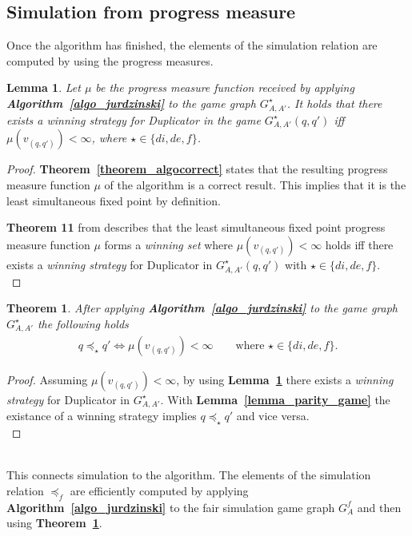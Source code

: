 \documentclass[12pt,oneside,bibliography=totoc,abstracton]{scrartcl}
\newcommand{\lemmaref}[1]{\textbf{Lemma~\ref{#1}}}
\newcommand{\theoremref}[1]{\textbf{Theorem~\ref{#1}}}
\newcommand{\algoref}[1]{\textbf{Algorithm~\ref{#1}}}
\newcommand{\libref}[1]{\textbf{\cite{#1}}}
\newtheorem{mylemma}{Lemma}
\newtheorem{mytheorem}{Theorem}
\begin{document}
\subsection{Simulation from progress measure}\label{section_compsimrelation}
Once the algorithm has finished, the elements of the simulation relation are computed
by using the progress measures.
\begin{mylemma}\label{lemma_algotostrat}
	Let $\mu$ be the progress measure function received by applying \algoref{algo_jurdzinski}
	to the game graph $G^{\star}_{A, A'}$. It holds that there exists a
	\textnormal{winning strategy} for Duplicator in the game $G^{\star}_{A, A'}(q, q')$
	iff $\mu(v_{(q, q')}) < \infty$, where $\star \in \{di, de, f\}$.
\end{mylemma}
\begin{proof}
	\theoremref{theorem_algocorrect} states that the resulting progress measure function
	$\mu$ of the algorithm is a correct result. This implies that it is the least simultaneous fixed point by definition.
	
	\textbf{Theorem 11} from \libref{jurdz_original} describes that the least simultaneous fixed point
	progress measure function $\mu$ forms a \textit{winning set} where $\mu(v_{(q, q')}) < \infty$ holds iff there
	exists a \textit{winning strategy} for Duplicator in $G^{\star}_{A, A'}(q, q')$ with $\star \in \{di, de, f\}$.\\
\end{proof}
\begin{mytheorem}\label{theorem_algotosim}
	After applying \algoref{algo_jurdzinski} to the game graph $G^{\star}_{A, A'}$ the following holds
	\begin{align*}
		q \preceq_{\star} q' \Leftrightarrow \mu(v_{(q, q')}) < \infty \qquad\text{where } \star \in \{di, de, f\}.
	\end{align*}
\end{mytheorem}
\begin{proof}
	Assuming $\mu(v_{(q, q')}) < \infty$, by using \lemmaref{lemma_algotostrat} there
	exists a \textit{winning strategy} for Duplicator in $G^{\star}_{A, A'}$.
	With \lemmaref{lemma_parity_game} the existance of a winning strategy
	implies $q \preceq_{\star} q'$ and vice versa.\\
\end{proof}\quad\\
This connects simulation to the algorithm. The elements of the simulation relation $\preceq_f$ are
efficiently computed by applying \algoref{algo_jurdzinski} to the fair simulation
game graph $G^f_A$ and then using \theoremref{theorem_algotosim}.
\end{document}
